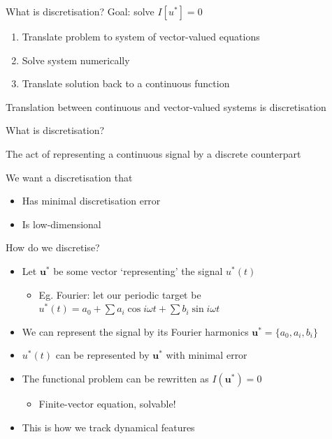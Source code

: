 \documentclass[presentation]{beamer}
\begin{document}
\begin{frame}[label={sec:orgb708f64}]{What is discretisation?}
Goal: solve \(I\left[u^*\right] = 0\)
\begin{enumerate}
\item Translate problem to system of vector-valued equations
\item Solve system numerically
\item Translate solution back to a continuous function
\end{enumerate}

\vfill
Translation between continuous and vector-valued systems is discretisation
\end{frame}

\begin{frame}[label={sec:org7bb0619}]{What is discretisation?}
\begin{definition}[Discretisation]
The act of representing a continuous signal by a discrete counterpart
\end{definition}

\vfill
We want a discretisation that
\begin{itemize}
\item Has minimal discretisation error
\item Is low-dimensional
\end{itemize}
\end{frame}

\begin{frame}[label={sec:orgfa89b96}]{How do we discretise?}
\begin{itemize}[<+->]
\item Let \(\mathbf{u^*}\) be some vector `representing' the signal \(u^*(t)\)
\begin{itemize}
\item Eg. Fourier: let our periodic target be \(u^*(t) = a_0 + \sum a_i \cos i\omega t + \sum b_i \sin i\omega t\)
\end{itemize}
\item We can represent the signal by its Fourier harmonics \(\mathbf{u^*}=\{a_0, a_i, b_i\}\)
\item \(u^*(t)\) can be represented by \(\mathbf{u}^*\) with minimal error
\item The functional problem can be rewritten as \(I\left(\mathbf{u}^*\right)=0\)
\begin{itemize}
\item Finite-vector equation, solvable!
\end{itemize}
\item This is how we track dynamical features
\end{itemize}
\end{frame}
\end{document}
